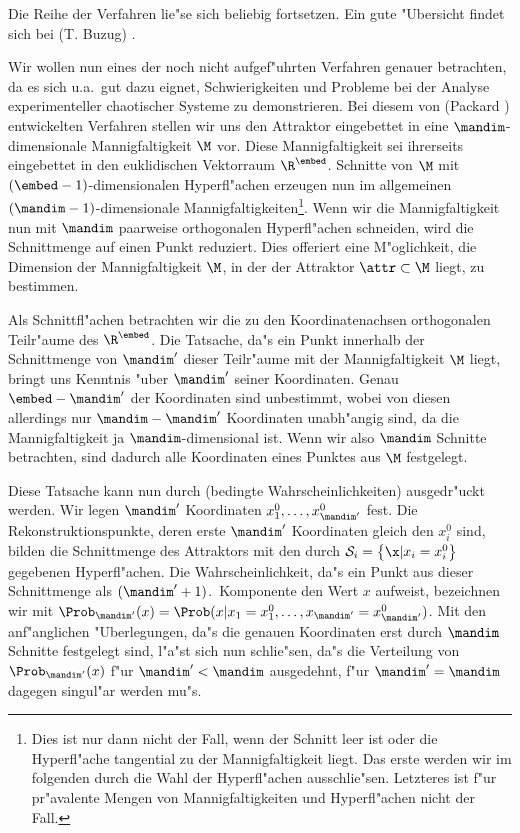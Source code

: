 Die Reihe der Verfahren lie"se sich beliebig fortsetzen. Ein gute "Ubersicht
findet sich bei \autor(T. Buzug) \cite{Buzug94}. 

Wir wollen nun eines der noch nicht
aufgef"uhrten Verfahren genauer betrachten, da es sich u.a.\  gut dazu eignet,
Schwierigkeiten und Probleme bei der Analyse experimenteller chaotischer Systeme zu
demonstrieren. Bei diesem von \autor(Packard \etal) \cite{Packard80} entwickelten Verfahren stellen wir
uns den Attraktor eingebettet in eine $\mandim$-dimensionale Mannigfaltigkeit $\M$ vor.
Diese Mannigfaltigkeit sei ihrerseits eingebettet in den euklidischen Vektorraum
$\R^\embed$.  Schnitte von $\M$ mit $(\embed-1)$-di\-men\-sio\-nalen Hyperfl"achen
erzeugen nun im allgemeinen $(\mandim-1)$-dimensionale Mannigfaltigkeiten\footnote{Dies
  ist nur dann nicht der Fall, wenn der Schnitt leer ist oder die Hyperfl"ache tangential
  zu der Mannigfaltigkeit liegt.  Das erste werden wir im folgenden durch die Wahl der
  Hyperfl"achen ausschlie"sen. Letzteres ist f"ur pr"avalente Mengen von
  Mannigfaltigkeiten und Hyperfl"achen nicht der Fall.}.  Wenn wir die
Mannigfaltigkeit nun mit $\mandim$ paarweise orthogonalen Hyperfl"achen schneiden, wird
die Schnittmenge auf einen Punkt reduziert. Dies offeriert eine M"oglichkeit, die Dimension
der Mannigfaltigkeit $\M$, in der der Attraktor $\attr\subset\M$ liegt, zu bestimmen.

Als Schnittfl"achen betrachten wir die zu den Koordinatenachsen orthogonalen Teil\-r"aume
des $\R^\embed$. Die Tatsache, da"s ein Punkt innerhalb der Schnittmenge von $\mandim'$
dieser Teil\-r"aume mit der Mannigfaltigkeit $\M$ liegt, bringt uns Kenntnis "uber
$\mandim'$ seiner Koordinaten. Genau $\embed-\mandim'$ der Koordinaten sind unbestimmt,
wobei von diesen allerdings nur $\mandim-\mandim'$ Koordinaten unabh"angig sind, da die
Mannigfaltigkeit ja $\mandim$-dimensional ist. Wenn wir also $\mandim$ Schnitte
betrachten, sind dadurch alle Koordinaten eines Punktes aus $\M$ festgelegt.

Diese Tatsache kann nun durch \begriff(bedingte Wahrscheinlichkeiten) ausgedr"uckt werden.
Wir legen $\mandim'$ Koordinaten $x^0_1,\dots,x^0_{\mandim'}$ fest. Die
Rekonstruktionspunkte, deren erste $\mandim'$ Koordinaten gleich den $x^0_i$ sind, bilden
die Schnittmenge des Attraktors mit den durch $\mathcal{S}_i=\left\{ \x \vert
  x_i=x^0_i\right\}$ gegebenen Hyperfl"achen. Die Wahrscheinlichkeit, da"s ein Punkt aus
dieser Schnittmenge als $(\mandim'+1)$.\  Komponente den Wert $x$ aufweist, bezeichnen wir
mit $\Prob_{\mandim'}(x)=\Prob(x\vert x_1=x^0_1,\dots,x_{\mandim'}=x^0_{\mandim'})$. Mit
den anf"anglichen "Uberlegungen, da"s die genauen Koordinaten erst durch $\mandim$
Schnitte festgelegt sind, l"a"st sich nun schlie"sen, da"s die Verteilung von
$\Prob_{\mandim'}(x)$ f"ur $\mandim'<\mandim$ ausgedehnt, f"ur $\mandim'=\mandim$ dagegen
singul"ar werden mu"s.

